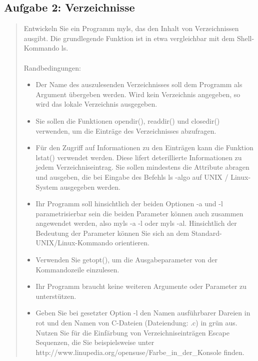 	\subsection{Aufgabe 2: Verzeichnisse}
		\begin{quote}
			Entwickeln Sie ein Programm myls, das den Inhalt von Verzeichnissen ausgibt. Die grundlegende Funktion ist in etwa vergleichbar mit dem Shell-Kommando ls.\\ \\
			Randbedingungen: \\
			\begin{itemize}
				\item Der Name des auszulesenden Verzeichnisses soll dem Programm als Argument \"ubergeben werden. Wird kein Verzeichnis angegeben, so wird das lokale Verzeichnis ausgegeben.\\
				\item Sie sollen die Funktionen opendir(), readdir() und closedir() verwenden, um die Eintr\"age des Verzeichnisses abzufragen.\\
				\item F\"ur den Zugriff auf Informationen zu den Eintr\"agen kann die Funktion lstat() verwendet werden. Diese lifert deterillierte Informationen zu jedem Verzeichniseintrag. Sie sollen mindestens die Attribute abragen und ausgeben, die bei Eingabe des Befehls ls -algo auf UNIX / Linux-System ausgegeben werden.\\
				\item Ihr Programm soll hinsichtlich der beiden Optionen -a und -l parametrisierbar sein die beiden Parameter k\"onnen auch zusammen angewendet werden, also myls -a -l oder myls -al. Hinsichtlich der Bedeutung der Parameter k\"onnen Sie sich an dem Standard-UNIX/Linux-Kommando orientieren.\\
				\item Verwenden Sie getopt(), um die Ausgabeparameter von der Kommandozeile einzulesen.\\
				\item Ihr Programm braucht keine weiteren Argumente oder Parameter zu unterst\"utzen.\\
				\item Geben Sie bei gesetzter Option -l den Namen ausf\"uhrbarer Dareien in rot und den Namen von C-Dateien (Dateiendung: .c) in gr\"un aus. Nutzen Sie f\"ur die Einf\"arbung von Verzeichniseintr\"agen Escape Sequenzen, die Sie beispielsweise unter http://www.linupedia.org/opensuse/Farbe\_in\_der\_Konsole finden.\\
			\end{itemize}
		\end{quote}
\newpage
